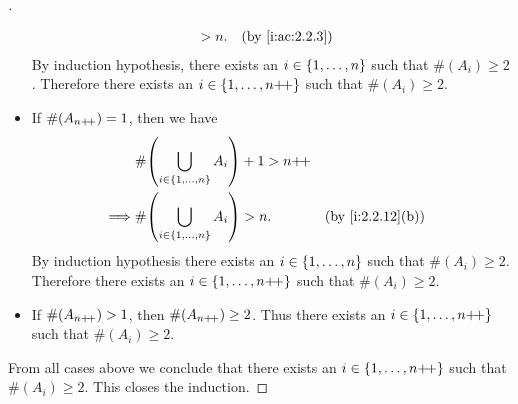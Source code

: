 \begin{proof}[]
\begin{itemize}
\begin{align*}
                                                            & > n.                                           &  & \by{i:ac:2.2.3}
          \end{align*}
          By induction hypothesis, there exists an \(i \in \left\lbrace1, \dots, n\right\rbrace\) such that \(\#(A_i) \geq 2\).
          Therefore there exists an \(i \in \left\lbrace1, \dots, n{+}\!{+}\right\rbrace\) such that \(\#(A_i) \geq 2\).
    \item If \(\#(A_{n{+}\!{+}}) = 1\), then we have
          \begin{align*}
                     & \#\pa{\bigcup_{i \in \set{1, \dots, n}} A_i} + 1 > n\pp                       \\
            \implies & \#\pa{\bigcup_{i \in \set{1, \dots, n}} A_i} > n.       &  & \by{i:2.2.12}[b]
          \end{align*}
          By induction hypothesis there exists an \(i \in \left\lbrace1, \dots, n\right\rbrace\) such that \(\#(A_i) \geq 2\).
          Therefore there exists an \(i \in \left\lbrace1, \dots, n{+}\!{+}\right\rbrace\) such that \(\#(A_i) \geq 2\).
    \item If \(\#(A_{n{+}\!{+}}) > 1\), then \(\#(A_{n{+}\!{+}}) \geq 2\).
          Thus there exists an \(i \in \left\lbrace1, \dots, n{+}\!{+}\right\rbrace\) such that \(\#(A_i) \geq 2\).
  \end{itemize}
  From all cases above we conclude that there exists an \(i \in \left\lbrace1, \dots, n{+}\!{+}\right\rbrace\) such that \(\#(A_i) \geq 2\).
  This closes the induction.
\end{proof}
